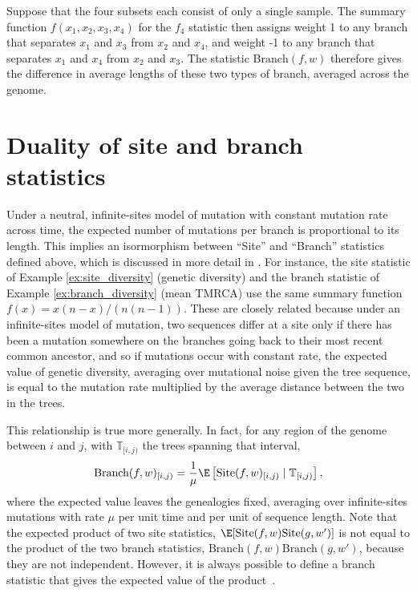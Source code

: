 \documentclass{article}
\newcommand{\branch}{\mbox{Branch}} %
\newcommand{\site}{\mbox{Site}} %
\newcommand{\given}{\;\vert\;}
\newcommand{\treeseq}{\mathbb{T}} %
\newcommand{\iw}{w} %
\begin{document}
\begin{example}[Patterson's $f_4$] \label{ex:branch_f4}
    Suppose that the four subsets each consist of only a single sample.
    The summary function $f(x_1, x_2, x_3, x_4)$ for the $f_4$ statistic
    then assigns weight 1 to any branch that separates $x_1$ and $x_3$ from $x_2$ and $x_4$,
    and weight -1 to any branch that separates $x_1$ and $x_4$ from $x_2$ and $x_3$.
    The statistic $\branch(f, \iw)$ therefore
    gives the difference in average lengths of these two types of branch,
    averaged across the genome.
\end{example}



\section*{Duality of site and branch statistics}

Under a neutral, infinite-sites model of mutation with constant mutation rate across time,
the expected number of mutations per branch is proportional to its length.
This implies an isormorphism between ``Site'' and ``Branch'' statistics defined above,
which is discussed in more detail in \citet{ralph2019empirical}.
For instance, the site statistic of Example \ref{ex:site_diversity} (genetic diversity)
and the branch statistic of Example \ref{ex:branch_diversity} (mean TMRCA)
use the same summary function $f(x) = x(n-x)/\left(n(n-1)\right)$.
These are closely related because under an infinite-sites model of mutation,
two sequences differ at a site only if there has been a mutation somewhere on the branches going back
to their most recent common ancestor,
and so if mutations occur with constant rate,
the expected value of genetic diversity,
averaging over mutational noise given the tree sequence,
is equal to the mutation rate multiplied by the average distance between the two in the trees.

This relationship is true more generally.
In fact, for any region of the genome between $i$ and $j$,
with $\treeseq_{[i,j)}$ the trees spanning that interval,
\begin{align}
    \branch(f, \iw)_{[i,j)}
    =
    \frac{1}{\mu}
    \E\left[ \site(f, \iw)_{[i,j)} \given \treeseq_{[i,j)} \right] ,
\end{align}
where the expected value leaves the genealogies fixed,
averaging over infinite-sites mutations
with rate $\mu$ per unit time and per unit of sequence length.
Note that the expected product of two site statistics,
$\E[\site(f, \iw) \site(g, \iw')]$
is not equal to the product of the two branch statistics, $\branch(f, \iw) \branch(g, \iw')$,
because they are not independent.
However, it is always possible to define a branch statistic that
gives the expected value of the product~\citep{ralph2019empirical}.
\end{document}
